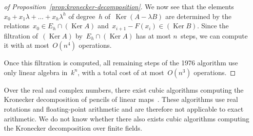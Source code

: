 \documentclass{lms}
\DeclareMathOperator\Ker{Ker}
\begin{document}
\begin{proof}[of Proposition~\ref{prop:kronecker-decomposition}]
We now see that the elements~$x_0 + x_1 λ + … + x_h λ^h$
of degree~$h$ of~$\Ker(A - λ B)$
are determined by the relations~$x_0 ∈ E_{h} ∩ (\Ker A)$
and~$x_{i+1} - F (x_i) ∈ (\Ker B)$.
Since the filtration of~$(\Ker A)$ by~$E_{h} ∩ (\Ker A)$
has at most $n$~steps, we can compute it with at most~$O(n^4)$ operations.

Once this filtration is computed,
all remaining steps of the 1976 algorithm use only linear algebra in~$k^n$,
with a total cost of at most~$O(n^3)$ operations.
\end{proof}

Over the real and complex numbers,
there exist cubic algorithms computing the Kronecker decomposition
of pencils of linear maps~\cite{beelen1988improved}.
These algorithms use real rotations and floating-point arithmetic
and are therefore not applicable to exact arithmetic.
We do not know whether there also exists cubic algorithms
computing the Kronecker decomposition over finite fields.
\end{document}
